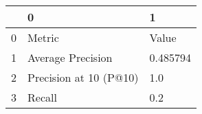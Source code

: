 \begin{tabular}{lll}
\toprule
{} &                       0 &         1 \\
\midrule
0 &                  Metric &     Value \\
1 &       Average Precision &  0.485794 \\
2 &  Precision at 10 (P@10) &       1.0 \\
3 &                  Recall &       0.2 \\
\bottomrule
\end{tabular}
